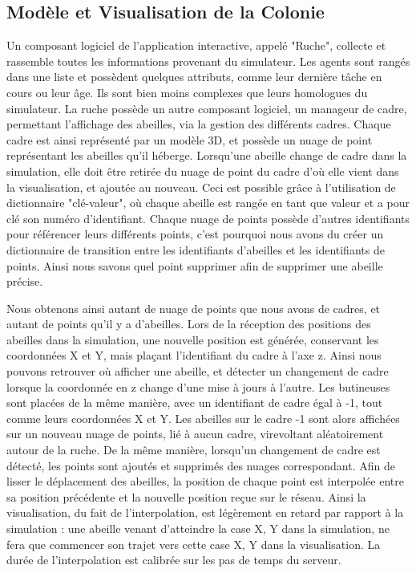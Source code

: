 	\subsection{Modèle et Visualisation de la Colonie}
		Un composant logiciel de l'application interactive, appelé "Ruche", collecte et rassemble toutes les informations provenant du simulateur. Les agents sont rangés dans une liste et possèdent quelques attributs, comme leur dernière tâche en cours ou leur âge. Ils sont bien moins complexes que leurs homologues du simulateur. La ruche possède un autre composant logiciel, un manageur de cadre, permettant l'affichage des abeilles, via la gestion des différents cadres. Chaque cadre est ainsi représenté par un modèle 3D, et possède un nuage de point représentant les abeilles qu'il héberge. Lorsqu'une abeille change de cadre dans la simulation, elle doit être retirée du nuage de point du cadre d'où elle vient dans la visualisation, et ajoutée au nouveau. Ceci est possible grâce à l'utilisation de dictionnaire "clé-valeur", où chaque abeille est rangée en tant que valeur et a pour clé son numéro d'identifiant. 
		Chaque nuage de points possède d'autres identifiants pour référencer leurs différents points, c'est pourquoi nous avons du créer un dictionnaire de transition entre les identifiants d'abeilles et les identifiants de points. Ainsi nous savons quel point supprimer afin de supprimer une abeille précise.
		
		Nous obtenons ainsi autant de nuage de points que nous avons de cadres, et autant de points qu'il y a d'abeilles. Lors de la réception des positions des abeilles dans la simulation, une nouvelle position est générée, conservant les coordonnées X et Y, mais plaçant l'identifiant du cadre à l'axe z. Ainsi nous pouvons retrouver où afficher une abeille, et détecter un changement de cadre lorsque la coordonnée en z change d'une mise à jours à l'autre. Les butineuses sont placées de la même manière, avec un identifiant de cadre égal à -1, tout comme leurs coordonnées X et Y. Les abeilles sur le cadre -1 sont alors affichées sur un nouveau nuage de points, lié à aucun cadre, virevoltant aléatoirement autour de la ruche. De la même manière, lorsqu'un changement de cadre est détecté, les points sont ajoutés et supprimés des nuages correspondant. Afin de lisser le déplacement des abeilles, la position de chaque point est interpolée entre sa position précédente et la nouvelle position reçue sur le réseau. Ainsi la visualisation, du fait de l'interpolation, est légèrement en retard par rapport à la simulation : une abeille venant d'atteindre la case X, Y dans la simulation, ne fera que commencer son trajet vers cette case X, Y dans la visualisation. La durée de l'interpolation est calibrée sur les pas de temps du serveur.
		
